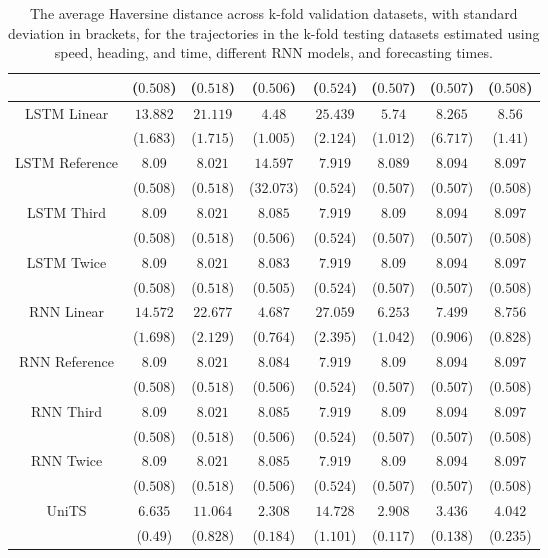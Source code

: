 \begin{table}[!ht]
{\begin{tabular}{|c|c|c|c|c|c|c|c|}
			 & ($0.508$) & ($0.518$) & ($0.506$) & ($0.524$) & ($0.507$) & ($0.507$) & ($0.508$) \\ \hline
			\multirow{2}{*}{LSTM Linear} & $13.882$ & $21.119$ & $4.48$ & $25.439$ & $5.74$ & $8.265$ & $8.56$ \\
			 & ($1.683$) & ($1.715$) & ($1.005$) & ($2.124$) & ($1.012$) & ($6.717$) & ($1.41$) \\ \hline
			\multirow{2}{*}{LSTM Reference} & $8.09$ & $8.021$ & $14.597$ & $7.919$ & $8.089$ & $8.094$ & $8.097$ \\
			 & ($0.508$) & ($0.518$) & ($32.073$) & ($0.524$) & ($0.507$) & ($0.507$) & ($0.508$) \\ \hline
			\multirow{2}{*}{LSTM Third} & $8.09$ & $8.021$ & $8.085$ & $7.919$ & $8.09$ & $8.094$ & $8.097$ \\
			 & ($0.508$) & ($0.518$) & ($0.506$) & ($0.524$) & ($0.507$) & ($0.507$) & ($0.508$) \\ \hline
			\multirow{2}{*}{LSTM Twice} & $8.09$ & $8.021$ & $8.083$ & $7.919$ & $8.09$ & $8.094$ & $8.097$ \\
			 & ($0.508$) & ($0.518$) & ($0.505$) & ($0.524$) & ($0.507$) & ($0.507$) & ($0.508$) \\ \hline
			\multirow{2}{*}{RNN Linear} & $14.572$ & $22.677$ & $4.687$ & $27.059$ & $6.253$ & $7.499$ & $8.756$ \\
			 & ($1.698$) & ($2.129$) & ($0.764$) & ($2.395$) & ($1.042$) & ($0.906$) & ($0.828$) \\ \hline
			\multirow{2}{*}{RNN Reference} & $8.09$ & $8.021$ & $8.084$ & $7.919$ & $8.09$ & $8.094$ & $8.097$ \\
			 & ($0.508$) & ($0.518$) & ($0.506$) & ($0.524$) & ($0.507$) & ($0.507$) & ($0.508$) \\ \hline
			\multirow{2}{*}{RNN Third} & $8.09$ & $8.021$ & $8.085$ & $7.919$ & $8.09$ & $8.094$ & $8.097$ \\
			 & ($0.508$) & ($0.518$) & ($0.506$) & ($0.524$) & ($0.507$) & ($0.507$) & ($0.508$) \\ \hline
			\multirow{2}{*}{RNN Twice} & $8.09$ & $8.021$ & $8.085$ & $7.919$ & $8.09$ & $8.094$ & $8.097$ \\
			 & ($0.508$) & ($0.518$) & ($0.506$) & ($0.524$) & ($0.507$) & ($0.507$) & ($0.508$) \\ \hline
			\multirow{2}{*}{UniTS} & $6.635$ & $11.064$ & $2.308$ & $14.728$ & $2.908$ & $3.436$ & $4.042$ \\
			 & ($0.49$) & ($0.828$) & ($0.184$) & ($1.101$) & ($0.117$) & ($0.138$) & ($0.235$) \\ \hline
		\end{tabular}
	}
	\caption{The average Haversine distance across k-fold validation datasets, with standard deviation in brackets, for the trajectories in the k-fold testing datasets estimated using speed, heading, and time, different RNN models, and forecasting times.}
	\label{tab:all_speed_actual_dir_haversine}
\end{table}